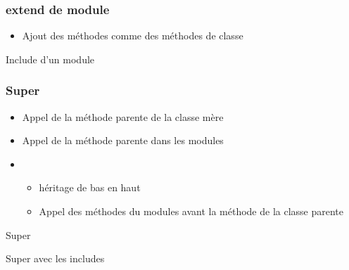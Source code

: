 \documentclass{beamer}
\begin{document}
\begin{frame}
  \frametitle{extend de module}
  \begin{itemize}
    \item Ajout des m\'ethodes comme des m\'ethodes de classe
  \end{itemize}
\end{frame}

\begin{frame}
  \begin{beamerboxesrounded}{Include d'un module}
    
  \end{beamerboxesrounded}
\end{frame}

\begin{frame}
  \frametitle{Super}
  \begin{itemize}
    \item Appel de la m\'ethode parente de la classe mère
    \item Appel de la m\'ethode parente dans les modules
    \item
      \begin{itemize}
        \item h\'eritage de bas en haut
        \item Appel des m\'ethodes du modules avant la m\'ethode de la classe parente
      \end{itemize}
  \end{itemize}
\end{frame}

\begin{frame}
  \begin{beamerboxesrounded}{Super}
    
  \end{beamerboxesrounded}
\end{frame}

\begin{frame}
  \begin{beamerboxesrounded}{Super avec les includes}
    
  \end{beamerboxesrounded}
\end{frame}
\end{document}
